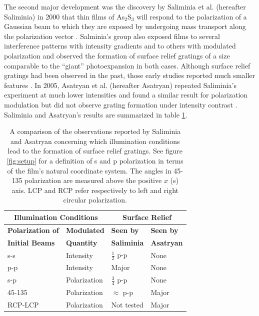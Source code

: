 \documentclass[twocolumn,showpacs,preprintnumbers,amsmath,amssymb]{revtex4}
\begin{document}
The second major development was the discovery by Saliminia et
al. (hereafter Saliminia) in 2000 that thin films of As$_{2}$S$_{3}$
will respond to the polarization of a Gaussian beam to which they are
exposed by undergoing mass transport along the polarization vector
\cite{saliminia}. Salminia's group also exposed films to several
interference patterns with intensity gradients and to others with
modulated polarization and observed the formation of surface relief
gratings of a size comparable to the ``giant'' photoexpansion in both
cases. Although surface relief gratings had been observed in the past,
those early studies reported much smaller features \cite{galstyan}. In
2005, Asatryan et al.  (hereafter Asatryan) repeated Saliminia's
experiment at much lower intensities and found a similar result for
polarization modulation but did not observe grating formation under
intensity contrast \cite{asatryan05}. Saliminia and Asatryan's results
are summarized in table \ref{tab:comparison}.

\begin{table}
\begin{ruledtabular}
\begin{tabular}{l l l l }
\multicolumn{2}{c}{\textbf{Illumination Conditions}}&\multicolumn{2}{c}{\textbf{Surface Relief}}\\
\hline
\textbf{Polarization of}&\textbf{Modulated}&\textbf{Seen by}&\textbf{Seen by}\\
\textbf{Initial Beams}& \textbf{Quantity}&\textbf{Saliminia}&\textbf{Asatryan}\\
\hline
s-s &Intensity&$\frac{1}{2}$ p-p    &   None\\
p-p &Intensity&Major    &   None\\
s-p&Polarization&$\frac{3}{4}$ p-p&None\\
45-135&Polarization&$\approx$ p-p&Major\\
RCP-LCP&Polarization&Not tested&Major\\
\end{tabular}
\end{ruledtabular}
\caption{A comparison of the observations reported by Saliminia and
Asatryan concerning which illumination conditions lead to the
formation of surface relief gratings. See figure \ref{fig:setup} for a
definition of s and p polarization in terms of the film's natural
coordinate system. The angles in 45-135 polarization are measured
above the positive $x$ (s) axis. LCP and RCP refer respectively to
left and right circular polarization.} \label{tab:comparison}
\end{table}
\end{document}
